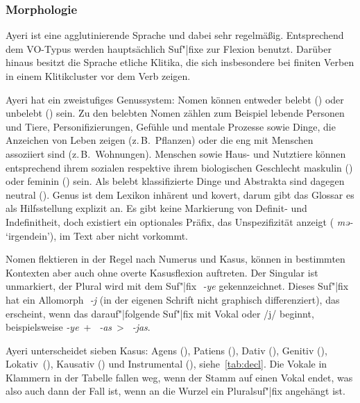 \documentclass[
	12pt,
	ngerman,
]{scrartcl}
\newcommand{\zwsp}{\mbox{​}} %
\newcommand{\rayr}[2]{\zwsp\smash{{\Tagati #1}} \emph{#2}} %
\newcommand{\xayr}[3]{\zwsp\smash{\Tagati #1} \emph{#2} `#3'} %
\begin{document}
\subsubsection{Morphologie}

Ayeri ist eine agglutinierende Sprache und dabei sehr regelmäßig. Entsprechend
dem VO-Typus werden hauptsächlich Suf"|fixe zur Flexion benutzt.
Darüber hinaus besitzt die Sprache etliche Klitika, die sich insbesondere bei
finiten Verben in einem Klitikcluster vor dem Verb zeigen.

\label{subsubsec:nom}

Ayeri hat ein zweistufiges Genussystem: Nomen können entweder belebt (\Anim)
oder unbelebt (\Inan) sein. Zu den belebten Nomen zählen zum Beispiel lebende
Personen und Tiere, Personifizierungen, Gefühle und mentale Prozesse sowie
Dinge, die Anzeichen von Leben zeigen (z.\,B.~Pflanzen) oder die eng mit
Menschen assoziiert sind (z.\,B.~Wohnungen). Menschen sowie Haus- und Nutztiere
können entsprechend ihrem sozialen respektive ihrem biologischen Geschlecht
maskulin (\M) oder feminin (\F) sein. Als belebt klassifizierte Dinge und
Abstrakta sind dagegen neutral (\N). Genus ist dem Lexikon inhärent und kovert,
darum gibt das Glossar es als Hilfsstellung explizit an. Es gibt keine
Markierung von Definit- und Indefinitheit, doch existiert ein optionales Präfix,
das Unspezifizität anzeigt (\xayr{me/}{mə-}{irgendein}), im Text aber nicht
vorkommt.

Nomen flektieren in der Regel nach Numerus und Kasus, können in bestimmten
Kontexten aber auch ohne overte Kasusflexion auftreten. Der Singular ist
unmarkiert, der Plural wird mit dem Suf"|fix \rayr{/ye}{-ye} gekennzeichnet.
Dieses Suf"|fix hat ein Allomorph \rayr{/ye}{-j} (in der eigenen Schrift nicht
graphisch differenziert), das erscheint, wenn das darauf"|folgende Suf"|fix mit
Vokal oder /j/ beginnt, beispielsweise
\rayr{/ye}{-ye}~+~\rayr{/AsF}{-as}~>~\rayr{/ye\_asF}{-jas}.

Ayeri unterscheidet sieben Kasus: Agens (\Aarg), Patiens (\Parg), Dativ (\Dat),
Genitiv (\Gen), Lokativ~(\Loc), Kausativ (\Caus) und Instrumental (\Ins),
siehe~\cref{tab:decl}. Die Vokale in Klammern in der Tabelle fallen weg, wenn
der Stamm auf einen Vokal endet, was also auch dann der Fall ist, wenn an die
Wurzel ein Pluralsuf"|fix angehängt ist.
\end{document}
